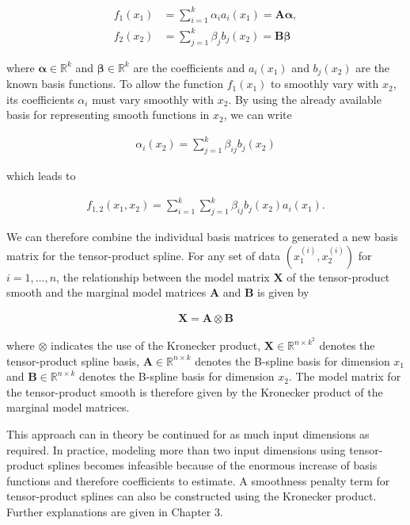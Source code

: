 \documentclass[10pt,a4paper]{article}
\begin{document}
\begin{align}
	f_1(x_1) &= \sum_{i=1}^{k} \alpha_i a_i(x_1) = \boldsymbol{A} \boldsymbol{\alpha}, \\
	f_2(x_2) &= \sum_{j=1}^{k} \beta_j b_j(x_2) = \boldsymbol{B} \boldsymbol{\beta}
\end{align}

where $\boldsymbol{\alpha} \in \mathbb{R}^{k}$ and $\boldsymbol{\beta} \in \mathbb{R}^{k}$ are the coefficients and $a_i(x_1)$ and $b_j(x_2)$ are the known basis functions. To allow the function $f_1(x_1)$ to smoothly vary with $x_2$, its coefficients $\alpha_i$ must vary smoothly with $x_2$. By using the already available basis for representing smooth functions in $x_2$, we can write

\begin{align}
	\alpha_i(x_2) = \sum_{j=1}^{k} \beta_{ij} b_j(x_2)
\end{align}

which leads to

\begin{align}
	f_{1,2}(x_1, x_2) = \sum_{i=1}^{k} \sum_{j=1}^{k} \beta_{ij} b_j(x_2) a_i(x_1).
\end{align}

We can therefore combine the individual basis matrices to generated a new basis matrix for the tensor-product spline. For any set of data $(x^{(i)}_{1}, x^{(i)}_{2})$ for $i = 1, \dots, n$, the relationship between the model matrix $\boldsymbol{X}$ of the tensor-product smooth and the marginal model matrices $\boldsymbol{A}$ and $\boldsymbol{B}$ is given by 

\begin{align}
	\boldsymbol{X} = \boldsymbol{A} \otimes \boldsymbol{B}
\end{align}

where $\otimes$ indicates the use of the Kronecker product, $\boldsymbol{X} \in \mathbb{R}^{n \times k^2}$ denotes the tensor-product spline basis, $\boldsymbol{A} \in \mathbb{R}^{n \times k}$ denotes the B-spline basis for dimension $x_1$ and $\boldsymbol{B} \in \mathbb{R}^{n \times k}$ denotes the B-spline basis for dimension $x_2$. The model matrix for the tensor-product smooth is therefore given by the Kronecker product of the marginal model matrices. \cite{wood2006GAM}  

This approach can in theory be continued for as much input dimensions as required. In practice, modeling more than two input dimensions using tensor-product splines becomes infeasible because of the enormous increase of basis functions and therefore coefficients to estimate. A smoothness penalty term for tensor-product splines can also be constructed using the Kronecker product. Further explanations are given in Chapter 3.
\end{document}
